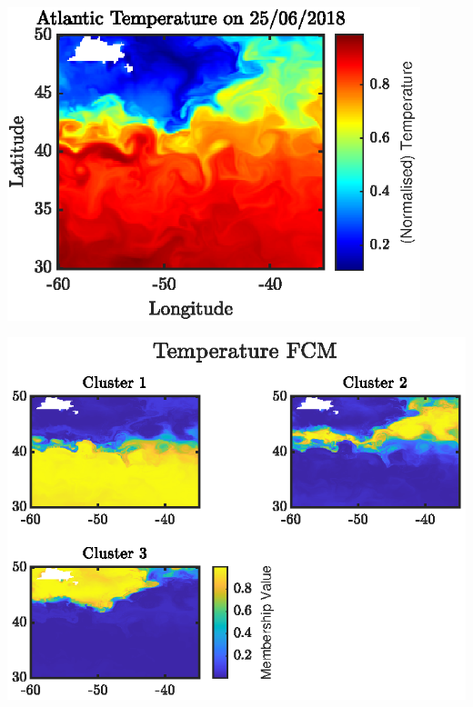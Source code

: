 \documentclass[english,svgnames,notes=hide,14pt]{beamer}
\begin{document}
\begin{frame}
	\centering
	\includegraphics[width=0.9\textwidth]{../figures/atlantic_temp}
\end{frame}

\begin{frame}
\centering
\includegraphics[width=1\textwidth]{../figures/atlantic_member_sst}
\end{frame}

\end{document}

